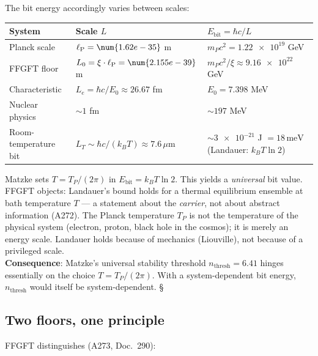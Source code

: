 The bit energy accordingly varies between scales:

\begin{center}
\small
\begin{tabular}{@{}lll@{}}
  \toprule
  System & Scale $L$ & $E_{\mathrm{bit}} = \hbar c/L$ \\
  \midrule
  Planck scale & $\lP = \num{1.62e-35}$ m & $m_P c^2 = \num{1.22e19}$ GeV \\
  FFGFT floor & $L_0 = \xi\cdot\lP = \num{2.155e-39}$ m & $m_P c^2/\xi \approx \num{9.16e22}$ GeV \\
  Characteristic & $L_e = \hbar c/E_0 \approx 26.67$ fm & $E_0 = 7.398$ MeV \\
  Nuclear physics & $\sim 1$ fm & $\sim 197$ MeV \\
  Room-temperature bit & $L_T \sim \hbar c/(k_BT) \approx 7.6\,\mu$m & $\sim \num{3e-21}$ J $= 18\,\mathrm{meV}$ (Landauer: $k_BT\ln 2$) \\
  \bottomrule
\end{tabular}
\end{center}

\begin{tcolorbox}[warnbox, title={FFGFT critique of Matzke's Landauer bridge}]
  Matzke sets $T = T_P/(2\pi)$ in $E_{\mathrm{bit}} = k_BT\ln 2$.
  This yields a \emph{universal} bit value.
  FFGFT objects: Landauer's bound holds for a thermal equilibrium
  ensemble at bath temperature $T$ — a statement about the
  \emph{carrier}, not about abstract information (A272).
  The Planck temperature $T_P$ is not the temperature of the physical
  system (electron, proton, black hole in the cosmos); it is merely an
  energy scale. Landauer holds because of mechanics (Liouville), not
  because of a privileged scale.\\[4pt]
  \textbf{Consequence}: Matzke's universal stability threshold
  $n_{\mathrm{thresh}} = 6.41$ hinges essentially on the choice
  $T = T_P/(2\pi)$. With a system-dependent bit energy, $n_{\mathrm{thresh}}$
  would itself be system-dependent. \S
\end{tcolorbox}

\subsection{Two floors, one principle}

FFGFT distinguishes (A273, Doc.\ 290):

